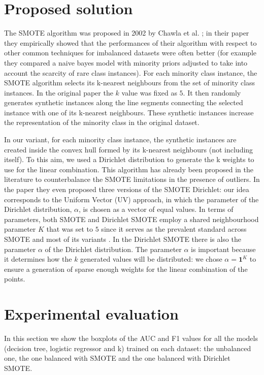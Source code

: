 \documentclass{article}
\begin{document}
\section{Proposed solution}
\label{sec:solution}
The SMOTE algorithm was proposed in 2002 by Chawla et al. \cite{chawla2002smote}; in their paper they empirically showed that the performances of their algorithm with respect to other common techniques for imbalanced datasets were often better (for example they compared a naive bayes model with minority priors adjusted to take into account the scarcity of rare class instances).
For each minority class instance, the SMOTE algorithm selects its k-nearest neighbours from the set of minority class instances. In the original paper the $k$ value was fixed as $5$. It then randomly generates synthetic instances along the line segments connecting the selected instance with one of its k-nearest neighbours. These synthetic instances increase the representation of the minority class in the original dataset.

In our variant, for each minority class instance, the synthetic instances are created inside the convex hull formed by its k-nearest neighbours (not including itself). To this aim, we used a Dirichlet distribution to generate the k weights to use for the linear combination. This algorithm has already been proposed in the literature \cite{matharaarachchi2024enhancing} to counterbalance the SMOTE limitations in the presence of outliers. In the paper they even proposed three versions of the SMOTE Dirichlet: our idea corresponds to the Uniform Vector (UV) approach, in which the parameter of the Dirichlet distribution, $\alpha$, is chosen as a vector of equal values.
In terms of parameters, both SMOTE and Dirichlet SMOTE employ a shared neighbourhood parameter $K$ that was set to $5$ since it serves as the prevalent standard across SMOTE and most of its variants \cite{chawla2002smote}. In the Dirichlet SMOTE there is also the parameter $ \alpha$ of the Dirichlet distribution. The parameter $\alpha$ is important because it determines how the $k$ generated values will be distributed: we chose $\alpha = \textbf{1}^{K} $ to ensure a generation of sparse enough weights for the linear combination of the points.

\section{Experimental evaluation}
\label{sec:experimental_evaluation}
In this section we show the boxplots of the AUC and F1 values for all the models (decision tree, logistic regressor and k) trained on each dataset: the unbalanced one, the one balanced with SMOTE and the one balanced with Dirichlet SMOTE. 
\end{document}
